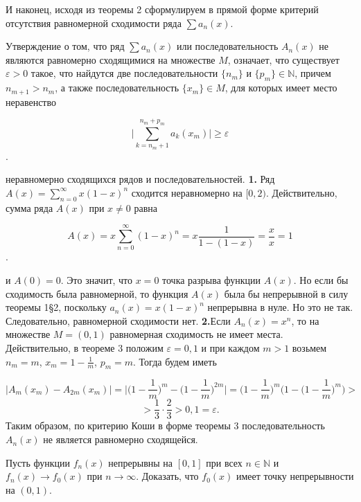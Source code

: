 И наконец, исходя из теоремы 2 сформулируем в прямой форме критерий отсутствия равномерной сходимости ряда $\sum a_n(x)$.
\vskip 5mm

\begin{theorem}
Утверждение о том, что ряд $\sum a_n(x)$ или последовательность $A_n(x)$ не являются равномерно сходящимися на множестве $M$, означает, что существует $\varepsilon>0$ такое, что найдутся две последовательности $\{n_m\}$ и $\{p_m\}\in \mathbb N$, причем $n_{m+1}>n_m$, а также последовательность $\{x_m\}\in M$, для которых имеет место неравенство 

$$\Biggl|\sum_{k=n_m+1}^{n_m+p_m}a_k(x_m)\Biggr|\ge\varepsilon$$.

\end{theorem}
\vskip 5mm

\begin{example}
неравномерно сходящихся рядов и последовательностей.
\vskip 5mm
{\bf1.} Ряд $A(x)=\sum_{n=0}^{\infty}x(1-x)^n$ сходится неравномерно на $[0,2)$.
\vskip 5mm
Действительно, сумма ряда $A(x)$ при $x\ne0$ равна 

$$A(x)=x\sum_{n=0}^{\infty}(1-x)^n=x\frac{1}{1-(1-x)}=\frac{x}{x}=1$$.

и $A(0)=0$. Это значит, что $x=0$ \texttwelveudash точка разрыва функции $A(x)$. Но если бы сходимость была равномерной, то функция $A(x)$ была бы непрерывной в силу теоремы 1\S2, поскольку $a_n(x)=x(1-x)^n$ непрерывна в нуле. Но это не так. Следовательно, равномерной сходимости нет.
\vskip 5mm
{\bf2.}Если $A_n(x)=x^n$, то на множестве $M=(0,1)$ равномерная сходимость не имеет места.\\
Действительно, в теореме 3 положим $\varepsilon=0,1$ и при каждом $m>1$ возьмем $n_m=m$, $x_m=1-\frac{1}{m}$, $p_m=m$. Тогда будем иметь 

$$|A_m(x_m)-A_{2m}(x_m)|=\Biggl|\biggl(1-\frac{1}{m}\biggr)^m-\biggl(1-\frac{1}{m}\biggr)^{2m}\Biggr|=\biggl(1-\frac{1}{m}\biggr)^m \biggl(1-\biggl(1-\frac{1}{m}\biggr)^m\biggr)>$$$$>\frac{1}{3}\cdot\frac{2}{3}
>0,1=\varepsilon.$$
Таким образом, по критерию Коши в форме теоремы 3 последовательность $A_n(x)$ не является равномерно сходящейся.
\end{example}
\vskip 5mm

\begin{task} 
Пусть функции $f_n(x)$ непрерывны на $[0,1]$ при всех $n\in \mathbb N$ и $f_n(x)\to f_0(x)$ при $n\to \infty$. Доказать, что $f_0(x)$ имеет точку непрерывности на $(0,1)$.
\end{task}
